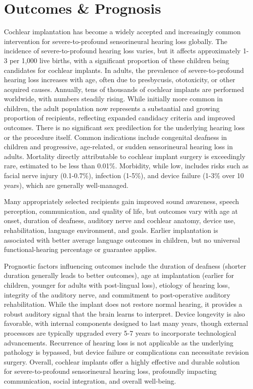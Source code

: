 \section*{Outcomes \& Prognosis}
Cochlear implantation has become a widely accepted and increasingly common intervention for severe-to-profound sensorineural hearing loss globally. The incidence of severe-to-profound hearing loss varies, but it affects approximately 1-3 per 1,000 live births, with a significant proportion of these children being candidates for cochlear implants. In adults, the prevalence of severe-to-profound hearing loss increases with age, often due to presbycusis, ototoxicity, or other acquired causes. Annually, tens of thousands of cochlear implants are performed worldwide, with numbers steadily rising. While initially more common in children, the adult population now represents a substantial and growing proportion of recipients, reflecting expanded candidacy criteria and improved outcomes. There is no significant sex predilection for the underlying hearing loss or the procedure itself. Common indications include congenital deafness in children and progressive, age-related, or sudden sensorineural hearing loss in adults. Mortality directly attributable to cochlear implant surgery is exceedingly rare, estimated to be less than 0.01\%. Morbidity, while low, includes risks such as facial nerve injury (0.1-0.7\%), infection (1-5\%), and device failure (1-3\% over 10 years), which are generally well-managed.

Many appropriately selected recipients gain improved sound awareness, speech perception, communication, and quality of life, but outcomes vary with age at onset, duration of deafness, auditory nerve and cochlear anatomy, device use, rehabilitation, language environment, and goals. Earlier implantation is associated with better average language outcomes in children, but no universal functional-hearing percentage or guarantee applies.

Prognostic factors influencing outcomes include the duration of deafness (shorter duration generally leads to better outcomes), age at implantation (earlier for children, younger for adults with post-lingual loss), etiology of hearing loss, integrity of the auditory nerve, and commitment to post-operative auditory rehabilitation. While the implant does not restore normal hearing, it provides a robust auditory signal that the brain learns to interpret. Device longevity is also favorable, with internal components designed to last many years, though external processors are typically upgraded every 5-7 years to incorporate technological advancements. Recurrence of hearing loss is not applicable as the underlying pathology is bypassed, but device failure or complications can necessitate revision surgery. Overall, cochlear implants offer a highly effective and durable solution for severe-to-profound sensorineural hearing loss, profoundly impacting communication, social integration, and overall well-being.

